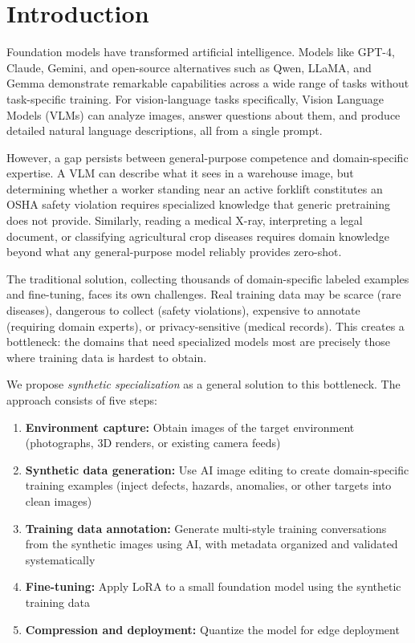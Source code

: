 \documentclass[12pt, a4paper]{article}
\begin{document}
\section{Introduction}

Foundation models have transformed artificial intelligence. Models like GPT-4, Claude, Gemini, and open-source alternatives such as Qwen, LLaMA, and Gemma demonstrate remarkable capabilities across a wide range of tasks without task-specific training. For vision-language tasks specifically, Vision Language Models (VLMs) can analyze images, answer questions about them, and produce detailed natural language descriptions, all from a single prompt.

However, a gap persists between general-purpose competence and domain-specific expertise. A VLM can describe what it sees in a warehouse image, but determining whether a worker standing near an active forklift constitutes an OSHA safety violation requires specialized knowledge that generic pretraining does not provide. Similarly, reading a medical X-ray, interpreting a legal document, or classifying agricultural crop diseases requires domain knowledge beyond what any general-purpose model reliably provides zero-shot.

The traditional solution, collecting thousands of domain-specific labeled examples and fine-tuning, faces its own challenges. Real training data may be scarce (rare diseases), dangerous to collect (safety violations), expensive to annotate (requiring domain experts), or privacy-sensitive (medical records). This creates a bottleneck: the domains that need specialized models most are precisely those where training data is hardest to obtain.

We propose \textit{synthetic specialization} as a general solution to this bottleneck. The approach consists of five steps:

\begin{enumerate}
    \item \textbf{Environment capture:} Obtain images of the target environment (photographs, 3D renders, or existing camera feeds)
    \item \textbf{Synthetic data generation:} Use AI image editing to create domain-specific training examples (inject defects, hazards, anomalies, or other targets into clean images)
    \item \textbf{Training data annotation:} Generate multi-style training conversations from the synthetic images using AI, with metadata organized and validated systematically
    \item \textbf{Fine-tuning:} Apply LoRA to a small foundation model using the synthetic training data
    \item \textbf{Compression and deployment:} Quantize the model for edge deployment
\end{enumerate}
\end{document}
